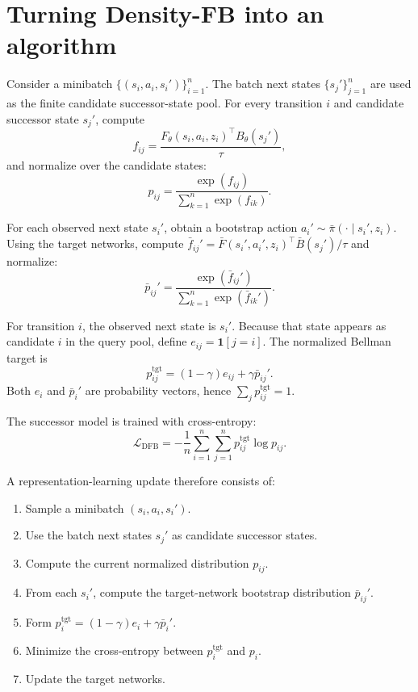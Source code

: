 \documentclass[11pt]{article}
\begin{document}
{\section{Turning Density-FB into an algorithm}
\label{sec:algorithm}

Consider a minibatch $\{(s_i,a_i,s_i')\}_{i=1}^{n}$.
The batch next states $\{s_j'\}_{j=1}^{n}$ are used as the finite candidate successor-state pool.
For every transition $i$ and candidate successor state $s_j'$, compute
\begin{equation}
    f_{ij} = \frac{ F_\theta(s_i,a_i,z_i)^\top B_\theta(s_j') }{\tau},
\end{equation}
and normalize over the candidate states:
\begin{equation}
\boxed{
    p_{ij} = \frac{ \exp(f_{ij}) }{ \sum_{k=1}^{n}\exp(f_{ik}) }.
}
\label{eq:p-current}
\end{equation}

For each observed next state $s_i'$, obtain a bootstrap action $a_i' \sim \bar\pi(\cdot\mid s_i',z_i)$.
Using the target networks, compute $\bar f_{ij}' = \bar F(s_i',a_i',z_i)^\top \bar B(s_j') / \tau$ and normalize:
\begin{equation}
\boxed{
    \bar p_{ij}' = \frac{ \exp(\bar f_{ij}') }{ \sum_{k=1}^{n} \exp(\bar f_{ik}') }.
}
\label{eq:p-target-bootstrap}
\end{equation}

For transition $i$, the observed next state is $s_i'$.
Because that state appears as candidate $i$ in the query pool, define $e_{ij} = \mathbf 1[j=i]$.
The normalized Bellman target is
\begin{equation}
\boxed{
    p_{ij}^{\mathrm{tgt}} = (1-\gamma)e_{ij} + \gamma\bar p_{ij}'.
}
\label{eq:p-bellman-target}
\end{equation}
Both $e_i$ and $\bar p_i'$ are probability vectors, hence $\sum_j p_{ij}^{\mathrm{tgt}} = 1$.

The successor model is trained with cross-entropy:
\begin{equation}
\boxed{
    \mathcal L_{\mathrm{DFB}}
    =
    -\frac{1}{n} \sum_{i=1}^{n} \sum_{j=1}^{n} p_{ij}^{\mathrm{tgt}} \log p_{ij}.
}
\label{eq:dfb-algorithm-loss}
\end{equation}

A representation-learning update therefore consists of:
\begin{enumerate}
    \item Sample a minibatch $(s_i,a_i,s_i')$.
    \item Use the batch next states $s_j'$ as candidate successor states.
    \item Compute the current normalized distribution $p_{ij}$.
    \item From each $s_i'$, compute the target-network bootstrap distribution $\bar p_{ij}'$.
    \item Form $p_i^{\mathrm{tgt}} = (1-\gamma)e_i + \gamma\bar p_i'$.
    \item Minimize the cross-entropy between $p_i^{\mathrm{tgt}}$ and $p_i$.
    \item Update the target networks.
\end{enumerate}

}
\end{document}
